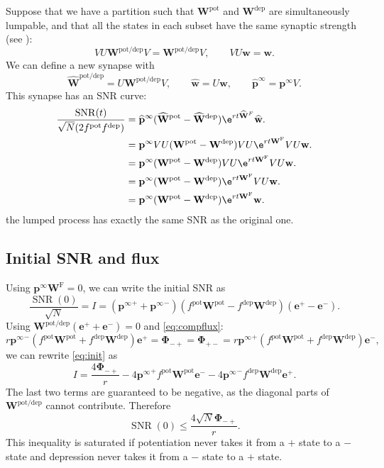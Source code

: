 \documentclass{article} %
\DeclareMathOperator{\SNR}{SNR}
\newcommand{\onev}{\mathbf{e}}
\newcommand{\pr}{\mathbf{p}}
\newcommand{\eq}{\pr^\infty}
\newcommand{\w}{\mathbf{w}}
\newcommand{\W}{\mathbf{W}}
\newcommand{\frg}{\W^{\mathrm{F}}}
\newcommand{\F}{\boldsymbol{\Phi}}
\newcommand{\pot}{^{\text{pot}}}
\newcommand{\dep}{^{\text{dep}}}
\newcommand{\potdep}{^{\text{pot/dep}}}
\begin{document}
Suppose that we have a partition such that $\W\pot $ and $\W\dep $ are simultaneously lumpable, and that all the states in each subset have the same synaptic strength (see ):
%
\begin{equation}\label{eq:lumpablesynapse}
  VU\W\potdep  V = \W\potdep  V,
  \qquad
  VU\w=\w.
\end{equation}
%
We can define a new synapse with
%
\begin{equation}\label{eq:lumpedsynapse}
  \widehat{\W}\potdep  = U\W\potdep  V,
  \qquad
  \widehat{\w} = U \w,
  \qquad
  \widehat{\mathbf{p}}^\infty = \eq V.
\end{equation}
%
This synapse has an SNR curve:
%
\begin{equation}\label{eq:lumpedSNR}
  \begin{aligned}
    \frac{\SNR(t)}{\sqrt{N} (2f\pot f\dep )} &=  \widehat{\mathbf{p}}^\infty (\widehat{\W}\pot  - \widehat{\W}\dep )\e^{rt\widehat{\W}^F}\widehat{\w}. \\
      &= \eq VU (\W\pot  - \W\dep ) VU \e^{rt\frg} VU \w. \\
      &= \eq (\W\pot  - \W\dep ) VU \e^{rt\frg} VU \w. \\
      &= \eq (\W\pot  - \W\dep )\e^{rt\frg} VU \w. \\
      &= \eq (\W\pot  - \W\dep )\e^{rt\frg}\w. \\
  \end{aligned}
\end{equation}
%
\ie the lumped process has exactly the same SNR as the original one.


\subsection{Initial SNR and flux}\label{sec:initflux}

Using $\eq\frg=0$, we can write the initial SNR as
%
\begin{equation}\label{eq:init}
  \frac{\SNR(0)}{\sqrt{N}} = I = ({\eq}^++{\eq}^-)(f\pot \W\pot -f\dep \W\dep )(\onev^+-\onev^-).
\end{equation}
%
Using $\W\potdep (\onev^++\onev^-)=0$ and \eqref{eq:compflux}:
%
\begin{equation*}
  r{\eq}^-(f\pot \W\pot +f\dep \W\dep )\onev^+ = \F_{-+} = \F_{+-} = r{\eq}^+(f\pot \W\pot +f\dep \W\dep )\onev^-,
\end{equation*}
%
we can rewrite \eqref{eq:init} as
%
\begin{equation}\label{eq:initflux}
  I = \frac{4\F_{-+}}{r} - 4{\eq}^+f\pot \W\pot \onev^- - 4{\eq}^-f\dep \W\dep \onev^+.
\end{equation}
%
The last two terms are guaranteed to be negative, as the diagonal parts of $\W\potdep $ cannot contribute.
Therefore
%
\begin{equation}\label{eq:initfluxineq}
  \SNR(0) \leq \frac{4\sqrt{N}\F_{-+}}{r}.
\end{equation}
%
This inequality is saturated if potentiation never takes it from a $+$ state to a $-$ state and depression never takes it from a $-$ state to a $+$ state.
\end{document}
